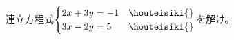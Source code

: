 連立方程式$\begin{cases}
2x+3y=-1 & \houteisiki{\label{emcases1}}\\
3x-2y=5 & \houteisiki{\label{emcases2}}
\end{cases}$を解け。
